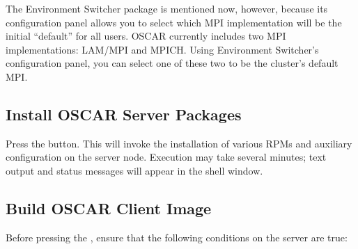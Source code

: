 The Environment Switcher package is mentioned now, however, because
its configuration panel allows you to select which MPI implementation
will be the initial ``default'' for all users.  OSCAR currently
includes two MPI implementations: LAM/MPI and MPICH.  Using
Environment Switcher's configuration panel, you can select one of
these two to be the cluster's default MPI.  



\subsection{Install OSCAR Server Packages}
\label{det:install-server-packages}

Press the  button.  This will
invoke the installation of various RPMs and auxiliary configuration on
the server node.  Execution may take several minutes; text output
and status messages will appear in the shell window.



\subsection{Build OSCAR Client Image}
\label{det:build-client-image}

Before pressing the , ensure that the
following conditions on the server are true:

